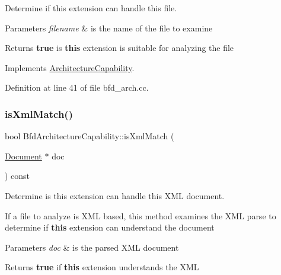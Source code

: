 Determine if this extension can handle this file. 


\begin{DoxyParams}{Parameters}
{\em filename} & is the name of the file to examine \\
\hline
\end{DoxyParams}
\begin{DoxyReturn}{Returns}
{\bfseries{true}} is {\bfseries{this}} extension is suitable for analyzing the file 
\end{DoxyReturn}


Implements \mbox{\hyperlink{class_architecture_capability_aa3d4fed15e42f3e853851babaf379376}{Architecture\+Capability}}.



Definition at line 41 of file bfd\+\_\+arch.\+cc.

\mbox{\label{class_bfd_architecture_capability_aa5231740c6fb12308f8e9a31ea291cf4}} 
\subsubsection{\texorpdfstring{isXmlMatch()}{isXmlMatch()}}
{\footnotesize\ttfamily bool Bfd\+Architecture\+Capability\+::is\+Xml\+Match (\begin{DoxyParamCaption}\item[{\mbox{\hyperlink{class_document}{Document}} $\ast$}]{doc }\end{DoxyParamCaption}) const\hspace{0.3cm}{\ttfamily [virtual]}}



Determine is this extension can handle this X\+ML document. 

If a file to analyze is X\+ML based, this method examines the X\+ML parse to determine if {\bfseries{this}} extension can understand the document 
\begin{DoxyParams}{Parameters}
{\em doc} & is the parsed X\+ML document \\
\hline
\end{DoxyParams}
\begin{DoxyReturn}{Returns}
{\bfseries{true}} if {\bfseries{this}} extension understands the X\+ML 
\end{DoxyReturn}


